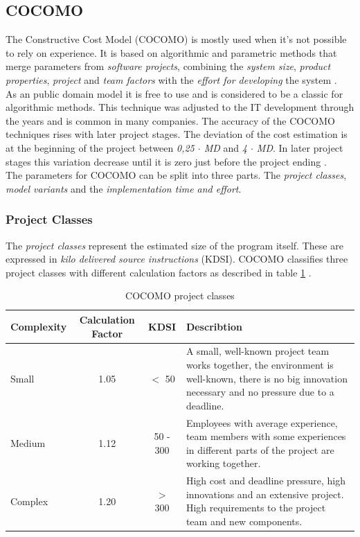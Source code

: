 \subsection{COCOMO} \label{COCOMOMethod}

The Constructive Cost Model (COCOMO) is mostly used when it's not possible to rely on experience. It is based on algorithmic and parametric methods that merge parameters from \textit{software projects}, combining the \textit{system size}, \textit{product properties}, \textit{project} and \textit{team factors} with the \textit{effort for developing} the system \cite{jenny}.\\
As an public domain model it is free to use and is considered to be a classic for algorithmic methods. This technique was adjusted to the IT development through the years and is common in many companies.
The accuracy of the COCOMO techniques rises with later project stages. The deviation of the cost estimation is at the beginning of the project between \textit{0,25 $\cdot$ MD} and \textit{4 $\cdot$ MD}. In later project stages this variation decrease until it is zero just before the project ending \cite{sommerville}.\\
The parameters for COCOMO can be split into three parts. The \textit{project classes}, \textit{model variants} and the \textit{implementation time and effort}.

\subsubsection{Project Classes}

The \textit{project classes} represent the estimated size of the program itself. These are expressed in \textit{kilo delivered source instructions} (KDSI). COCOMO classifies three project classes with different calculation factors as described in table \ref{tab:projectclasses} \cite{sommerville}.

\begin{table}[h]
	\centering 
	\setlength{\tabcolsep}{4pt}
	\begin{tabular}{|l|c|c|p{6cm}|}\hline
		Complexity	& Calculation Factor& KDSI 	& Describtion\\ \hline
		Small   	& 1.05        		& $<$ 50  			& A small, well-known project team works together, the environment is well-known, there is no big innovation necessary and no pressure due to a deadline.\\ \hline
		Medium 		& 1.12        		& 50 - 300 			& Employees with average experience, team members with some experiences in different parts of the project are working together.  \\ \hline
		Complex 	& 1.20 				& $>$ 300 			& High cost and deadline pressure, high innovations and an extensive project. High requirements to the project team and new components.  \\ \hline
	\end{tabular} 
	\caption{COCOMO project classes} 
	\label{tab:projectclasses} 
\end{table}

